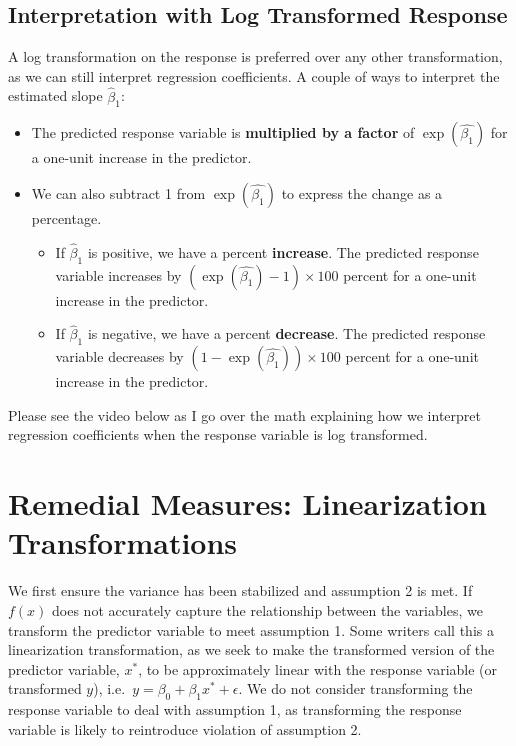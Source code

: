 \documentclass[
]{book}
\providecommand{\tightlist}{%
  \setlength{\itemsep}{0pt}\setlength{\parskip}{0pt}}
\begin{document}
\hypertarget{interpretation-with-log-transformed-response}{%
\subsection{Interpretation with Log Transformed Response}\label{interpretation-with-log-transformed-response}}

A log transformation on the response is preferred over any other transformation, as we can still interpret regression coefficients. A couple of ways to interpret the estimated slope \(\hat{\beta}_1\):

\begin{itemize}
\tightlist
\item
  The predicted response variable is \textbf{multiplied by a factor} of \(\exp(\hat{\beta_1})\) for a one-unit increase in the predictor.
\item
  We can also subtract 1 from \(\exp(\hat{\beta_1})\) to express the change as a percentage.

  \begin{itemize}
  \tightlist
  \item
    If \(\hat{\beta}_1\) is positive, we have a percent \textbf{increase}. The predicted response variable increases by \((\exp(\hat{\beta_1}) - 1) \times 100\) percent for a one-unit increase in the predictor.
  \item
    If \(\hat{\beta}_1\) is negative, we have a percent \textbf{decrease}. The predicted response variable decreases by \((1 - \exp(\hat{\beta_1})) \times 100\) percent for a one-unit increase in the predictor.
  \end{itemize}
\end{itemize}

Please see the video below as I go over the math explaining how we interpret regression coefficients when the response variable is log transformed.

\hypertarget{remedial-measures-linearization-transformations}{%
\section{Remedial Measures: Linearization Transformations}\label{remedial-measures-linearization-transformations}}

We first ensure the variance has been stabilized and assumption 2 is met. If \(f(x)\) does not accurately capture the relationship between the variables, we transform the predictor variable to meet assumption 1. Some writers call this a linearization transformation, as we seek to make the transformed version of the predictor variable, \(x^*\), to be approximately linear with the response variable (or transformed \(y\)), i.e.~\(y = \beta_0 + \beta_1 x^* + \epsilon\). We do not consider transforming the response variable to deal with assumption 1, as transforming the response variable is likely to reintroduce violation of assumption 2.
\end{document}
